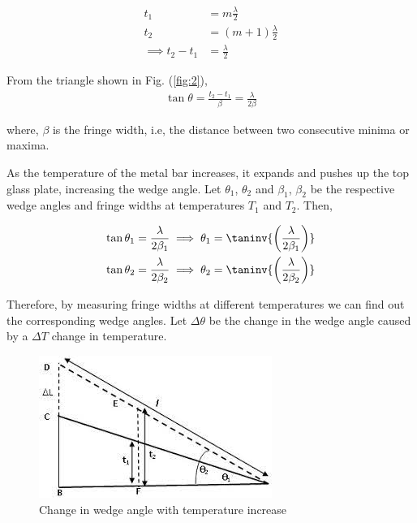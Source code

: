 \begin{align}
    t_1 &= m\frac{\lambda}{2} \nonumber \\
    t_2 &= (m+1)\frac{\lambda}{2} \nonumber \\
    \implies t_2 - t_1 &= \frac{\lambda}{2}
\end{align}

From the triangle shown in Fig. (\ref{fig:2}),
\begin{align}
    \tan \theta = \frac{t_2 - t_1}{\beta} = \frac{\lambda}{2\beta}
\end{align}

where, $\beta$ is the fringe width, i.e, the distance between two consecutive minima or maxima.

As the temperature of the metal bar increases, it expands and
pushes up the top glass plate, increasing the wedge angle. Let
$\theta_1$, $\theta_2$ and $\beta_1$, $\beta_2$ be the respective wedge angles and fringe
widths at temperatures $T_1$ and $T_2$. Then,

\begin{align*}
    \tan \theta_1 = \frac{\lambda}{2\beta_1} \implies \theta_1 = \taninv{\left(\frac{\lambda}{2\beta_1}\right)} \\
    \tan \theta_2 = \frac{\lambda}{2\beta_2} \implies \theta_2 = \taninv{\left(\frac{\lambda}{2\beta_2}\right)} \\
\end{align*}

Therefore, by measuring fringe widths at different temperatures we can find out the corresponding wedge angles. Let $\Delta \theta$
be the change in the wedge angle caused by a $\Delta T$ change in
temperature.

\begin{figure}[H]
    \centering
    \includegraphics[width=0.8\columnwidth]{images/f3.jpeg}
    \caption{Change in wedge angle with temperature increase}
    \label{fig:3}
\end{figure}

